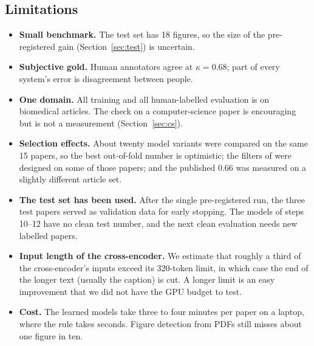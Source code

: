 \subsection{Limitations}
\begin{itemize}
  \item \textbf{Small benchmark.} The test set has 18 figures, so the size of the pre-registered gain
        (Section~\ref{sec:test}) is uncertain.
  \item \textbf{Subjective gold.} Human annotators agree at $\kappa=0.68$; part of every system's error is
        disagreement between people.
  \item \textbf{One domain.} All training and all human-labelled evaluation is on biomedical articles. The
        check on a computer-science paper is encouraging but is not a measurement (Section~\ref{sec:cs}).
  \item \textbf{Selection effects.} About twenty model variants were compared on the same 15 papers, so the
        best out-of-fold number is optimistic; the filters of \bof{} were designed on some of those papers;
        and the published 0.66 was measured on a slightly different article set.
  \item \textbf{The test set has been used.} After the single pre-registered run, the three test papers
        served as validation data for early stopping. The models of steps 10--12 have no clean test number,
        and the next clean evaluation needs new labelled papers.
  \item \textbf{Input length of the cross-encoder.} We estimate that roughly a third of the cross-encoder's
        inputs exceed its 320-token limit, in which case the end of the longer text (usually the caption) is
        cut. A longer limit is an easy improvement that we did not have the GPU budget to test.
  \item \textbf{Cost.} The learned models take three to four minutes per paper on a laptop, where the rule
        takes seconds. Figure detection from PDFs still misses about one figure in ten.
\end{itemize}

